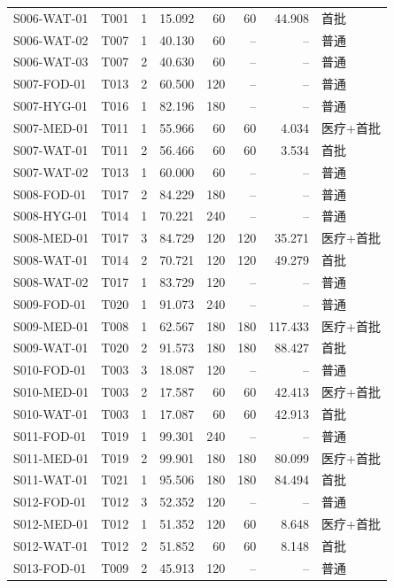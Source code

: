 \begin{longtable}{@{}llrrrrrl@{}}
S006-WAT-01 & T001 & 1 & 15.092 & 60 & 60 & 44.908 & 首批 \\
S006-WAT-02 & T007 & 1 & 40.130 & 60 & -- & -- & 普通 \\
S006-WAT-03 & T007 & 2 & 40.630 & 60 & -- & -- & 普通 \\
S007-FOD-01 & T013 & 2 & 60.500 & 120 & -- & -- & 普通 \\
S007-HYG-01 & T016 & 1 & 82.196 & 180 & -- & -- & 普通 \\
S007-MED-01 & T011 & 1 & 55.966 & 60 & 60 & 4.034 & 医疗+首批 \\
S007-WAT-01 & T011 & 2 & 56.466 & 60 & 60 & 3.534 & 首批 \\
S007-WAT-02 & T013 & 1 & 60.000 & 60 & -- & -- & 普通 \\
S008-FOD-01 & T017 & 2 & 84.229 & 180 & -- & -- & 普通 \\
S008-HYG-01 & T014 & 1 & 70.221 & 240 & -- & -- & 普通 \\
S008-MED-01 & T017 & 3 & 84.729 & 120 & 120 & 35.271 & 医疗+首批 \\
S008-WAT-01 & T014 & 2 & 70.721 & 120 & 120 & 49.279 & 首批 \\
S008-WAT-02 & T017 & 1 & 83.729 & 120 & -- & -- & 普通 \\
S009-FOD-01 & T020 & 1 & 91.073 & 240 & -- & -- & 普通 \\
S009-MED-01 & T008 & 1 & 62.567 & 180 & 180 & 117.433 & 医疗+首批 \\
S009-WAT-01 & T020 & 2 & 91.573 & 180 & 180 & 88.427 & 首批 \\
S010-FOD-01 & T003 & 3 & 18.087 & 120 & -- & -- & 普通 \\
S010-MED-01 & T003 & 2 & 17.587 & 60 & 60 & 42.413 & 医疗+首批 \\
S010-WAT-01 & T003 & 1 & 17.087 & 60 & 60 & 42.913 & 首批 \\
S011-FOD-01 & T019 & 1 & 99.301 & 240 & -- & -- & 普通 \\
S011-MED-01 & T019 & 2 & 99.901 & 180 & 180 & 80.099 & 医疗+首批 \\
S011-WAT-01 & T021 & 1 & 95.506 & 180 & 180 & 84.494 & 首批 \\
S012-FOD-01 & T012 & 3 & 52.352 & 120 & -- & -- & 普通 \\
S012-MED-01 & T012 & 1 & 51.352 & 120 & 60 & 8.648 & 医疗+首批 \\
S012-WAT-01 & T012 & 2 & 51.852 & 60 & 60 & 8.148 & 首批 \\
S013-FOD-01 & T009 & 2 & 45.913 & 120 & -- & -- & 普通 \\

\end{longtable}
